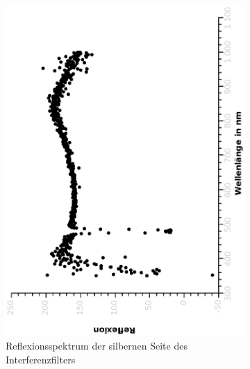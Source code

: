 \documentclass{article}
\begin{document}
\begin{figure}[H]
\begin{subfigure}[h]{0.4\textwidth}
\includegraphics[width=\textwidth ,angle=-90]{eps/interreflsilber.eps}
\caption{Reflexionsspektrum der silbernen Seite des Interferenzfilters}
\end{subfigure}
\begin{subfigure}[h]{0.4\textwidth}

\end{subfigure}
\end{figure}
\end{document}
